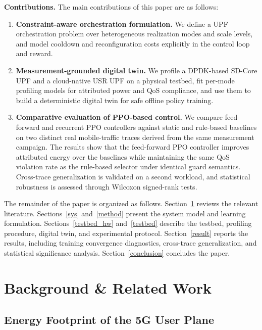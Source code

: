 \documentclass[a4paper,fleqn]{cas-sc}
\begin{document}
\textbf{Contributions.} The main contributions of this paper are as follows:
\begin{enumerate}
    \item \textbf{Constraint-aware orchestration formulation.} We define a UPF orchestration problem over heterogeneous realization modes and scale levels, and model cooldown and reconfiguration costs explicitly in the control loop and reward.
    \item \textbf{Measurement-grounded digital twin.} We profile a DPDK-based SD-Core UPF and a cloud-native USR UPF on a physical testbed, fit per-mode profiling models for attributed power and QoS compliance, and use them to build a deterministic digital twin for safe offline policy training.
    \item \textbf{Comparative evaluation of PPO-based control.} We compare feed-forward and recurrent PPO controllers against static and rule-based baselines on two distinct real mobile-traffic traces derived from the same measurement campaign. The results show that the feed-forward PPO controller improves attributed energy over the baselines while maintaining the same QoS violation rate as the rule-based selector under identical guard semantics. Cross-trace generalization is validated on a second workload, and statistical robustness is assessed through Wilcoxon signed-rank tests.
\end{enumerate}

The remainder of the paper is organized as follows. Section~\ref{related} reviews the relevant literature. Sections~\ref{sys} and~\ref{method} present the system model and learning formulation. Sections~\ref{testbed_hw} and~\ref{testbed} describe the testbed, profiling procedure, digital twin, and experimental protocol. Section~\ref{result} reports the results, including training convergence diagnostics, cross-trace generalization, and statistical significance analysis. Section~\ref{conclusion} concludes the paper.

\section{Background \& Related Work}
\label{related}

\subsection{Energy Footprint of the 5G User Plane}
\label{subsec:rel_energy}
\end{document}
